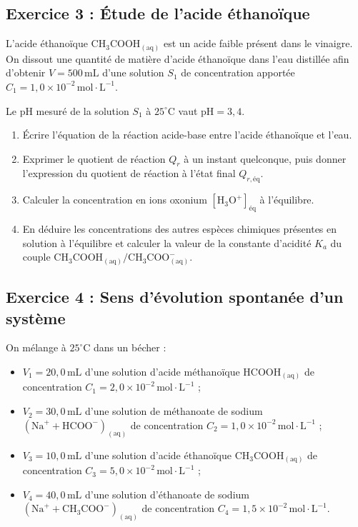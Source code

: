 \documentclass[12pt,a4paper]{article}
\begin{document}
\subsection*{Exercice 3 : Étude de l'acide éthanoïque}

L'acide éthanoïque $\text{CH}_3\text{COOH}_{(\text{aq})}$ est un acide faible présent dans le vinaigre. On dissout une quantité de matière d'acide éthanoïque dans l'eau distillée afin d'obtenir $V = 500\,\text{mL}$ d'une solution $S_1$ de concentration apportée $C_1 = 1,0 \times 10^{-2}\,\text{mol}\cdot\text{L}^{-1}$.

Le $\text{pH}$ mesuré de la solution $S_1$ à $25^\circ\text{C}$ vaut $\text{pH} = 3,4$.

\begin{enumerate}
    \item Écrire l'équation de la réaction acide-base entre l'acide éthanoïque et l'eau.
    \item Exprimer le quotient de réaction $Q_{r}$ à un instant quelconque, puis donner l'expression du quotient de réaction à l'état final $Q_{r,\text{éq}}$.
    \item Calculer la concentration en ions oxonium $[\text{H}_3\text{O}^+]_{\text{éq}}$ à l'équilibre.
    \item En déduire les concentrations des autres espèces chimiques présentes en solution à l'équilibre et calculer la valeur de la constante d'acidité $K_a$ du couple $\text{CH}_3\text{COOH}_{(\text{aq})} / \text{CH}_3\text{COO}^-_{(\text{aq})}$.
\end{enumerate}


\subsection*{Exercice 4 : Sens d'évolution spontanée d'un système}

On mélange à $25^\circ\text{C}$ dans un bécher :
\begin{itemize}
    \item $V_1 = 20,0\,\text{mL}$ d'une solution d'acide méthanoïque $\text{HCOOH}_{(\text{aq})}$ de concentration $C_1 = 2,0 \times 10^{-2}\,\text{mol}\cdot\text{L}^{-1}$ ;
    \item $V_2 = 30,0\,\text{mL}$ d'une solution de méthanoate de sodium $(\text{Na}^+ + \text{HCOO}^-)_{(\text{aq})}$ de concentration $C_2 = 1,0 \times 10^{-2}\,\text{mol}\cdot\text{L}^{-1}$ ;
    \item $V_3 = 10,0\,\text{mL}$ d'une solution d'acide éthanoïque $\text{CH}_3\text{COOH}_{(\text{aq})}$ de concentration $C_3 = 5,0 \times 10^{-2}\,\text{mol}\cdot\text{L}^{-1}$ ;
    \item $V_4 = 40,0\,\text{mL}$ d'une solution d'éthanoate de sodium $(\text{Na}^+ + \text{CH}_3\text{COO}^-)_{(\text{aq})}$ de concentration $C_4 = 1,5 \times 10^{-2}\,\text{mol}\cdot\text{L}^{-1}$.
\end{itemize}
\end{document}
